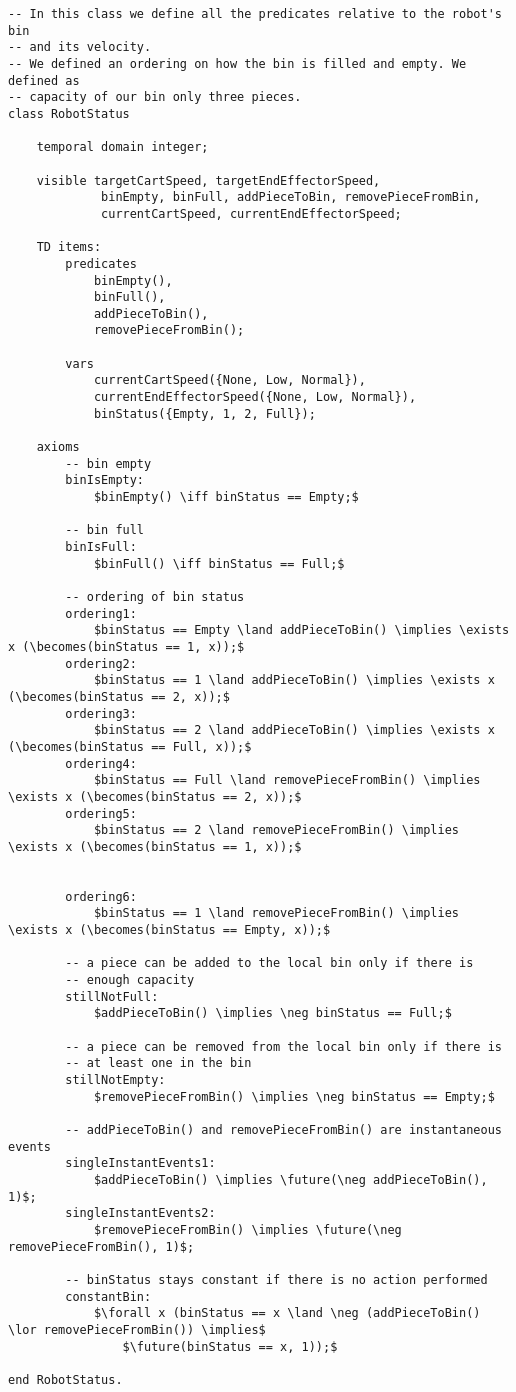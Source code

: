 \begin{lstlisting}[fontadjust, mathescape, frame=single] 
-- In this class we define all the predicates relative to the robot's bin 
-- and its velocity.
-- We defined an ordering on how the bin is filled and empty. We defined as 
-- capacity of our bin only three pieces.
class RobotStatus

    temporal domain integer;

    visible targetCartSpeed, targetEndEffectorSpeed, 
             binEmpty, binFull, addPieceToBin, removePieceFromBin,
             currentCartSpeed, currentEndEffectorSpeed;

    TD items:
        predicates
            binEmpty(),
            binFull(),
            addPieceToBin(),
            removePieceFromBin();

        vars
            currentCartSpeed({None, Low, Normal}),
            currentEndEffectorSpeed({None, Low, Normal}),
            binStatus({Empty, 1, 2, Full});

    axioms
        -- bin empty
        binIsEmpty:
            $binEmpty() \iff binStatus == Empty;$

        -- bin full
        binIsFull:
            $binFull() \iff binStatus == Full;$

        -- ordering of bin status
        ordering1:
            $binStatus == Empty \land addPieceToBin() \implies \exists x (\becomes(binStatus == 1, x));$
        ordering2:
            $binStatus == 1 \land addPieceToBin() \implies \exists x (\becomes(binStatus == 2, x));$
        ordering3:
            $binStatus == 2 \land addPieceToBin() \implies \exists x (\becomes(binStatus == Full, x));$
        ordering4:
            $binStatus == Full \land removePieceFromBin() \implies \exists x (\becomes(binStatus == 2, x));$
        ordering5:
            $binStatus == 2 \land removePieceFromBin() \implies \exists x (\becomes(binStatus == 1, x));$

            
        ordering6:
            $binStatus == 1 \land removePieceFromBin() \implies \exists x (\becomes(binStatus == Empty, x));$

        -- a piece can be added to the local bin only if there is 
        -- enough capacity
        stillNotFull:
            $addPieceToBin() \implies \neg binStatus == Full;$

        -- a piece can be removed from the local bin only if there is
        -- at least one in the bin
        stillNotEmpty:
            $removePieceFromBin() \implies \neg binStatus == Empty;$

        -- addPieceToBin() and removePieceFromBin() are instantaneous events
        singleInstantEvents1:
            $addPieceToBin() \implies \future(\neg addPieceToBin(), 1)$;
        singleInstantEvents2:
            $removePieceFromBin() \implies \future(\neg removePieceFromBin(), 1)$;

        -- binStatus stays constant if there is no action performed
        constantBin: 
            $\forall x (binStatus == x \land \neg (addPieceToBin() \lor removePieceFromBin()) \implies$
                $\future(binStatus == x, 1));$

end RobotStatus.
\end{lstlisting}